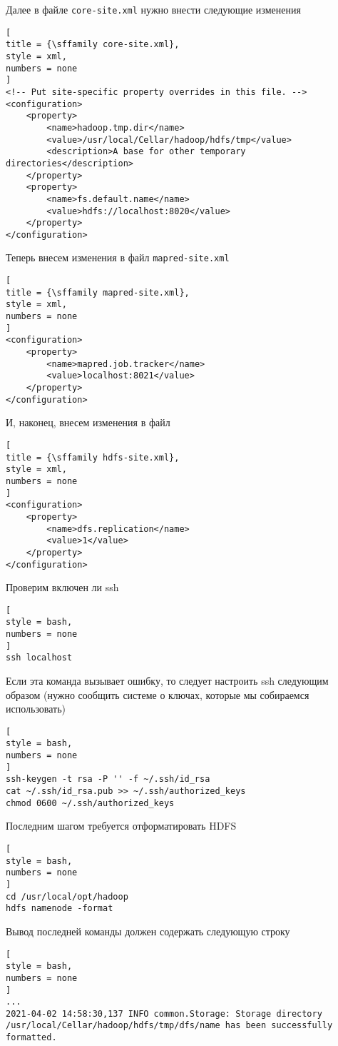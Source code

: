 \documentclass[%
	11pt,
	a4paper,
	utf8,
		]{article}
\begin{document}
Далее в файле \texttt{core-site.xml} нужно внести следующие изменения
\begin{lstlisting}[
title = {\sffamily core-site.xml},
style = xml,
numbers = none	
]
<!-- Put site-specific property overrides in this file. -->
<configuration>
	<property>
		<name>hadoop.tmp.dir</name>
		<value>/usr/local/Cellar/hadoop/hdfs/tmp</value>
		<description>A base for other temporary directories</description>             
	</property>
	<property>
		<name>fs.default.name</name>
		<value>hdfs://localhost:8020</value>
	</property>
</configuration>
\end{lstlisting}

Теперь внесем изменения в файл \texttt{mapred-site.xml}
\begin{lstlisting}[
title = {\sffamily mapred-site.xml},
style = xml,
numbers = none	
]
<configuration>
	<property>
		<name>mapred.job.tracker</name>
		<value>localhost:8021</value>
	</property>
</configuration>
\end{lstlisting}

И, наконец, внесем изменения в файл 
\begin{lstlisting}[
title = {\sffamily hdfs-site.xml},
style = xml,
numbers = none	
]
<configuration>
	<property>
		<name>dfs.replication</name>
		<value>1</value>
	</property>
</configuration>
\end{lstlisting}

Проверим включен ли ssh
\begin{lstlisting}[
style = bash,
numbers = none	
]
ssh localhost
\end{lstlisting}

Если эта команда вызывает ошибку, то следует настроить ssh следующим образом (нужно сообщить системе о ключах, которые мы собираемся использовать)
\begin{lstlisting}[
style = bash,
numbers = none	
]
ssh-keygen -t rsa -P '' -f ~/.ssh/id_rsa
cat ~/.ssh/id_rsa.pub >> ~/.ssh/authorized_keys
chmod 0600 ~/.ssh/authorized_keys
\end{lstlisting}

Последним шагом требуется отформатировать HDFS
\begin{lstlisting}[
style = bash,
numbers = none	
]
cd /usr/local/opt/hadoop
hdfs namenode -format
\end{lstlisting}

Вывод последней команды должен содержать следующую строку
\begin{lstlisting}[
style = bash,
numbers = none	
]
...
2021-04-02 14:58:30,137 INFO common.Storage: Storage directory /usr/local/Cellar/hadoop/hdfs/tmp/dfs/name has been successfully formatted.
\end{lstlisting}
\end{document}
